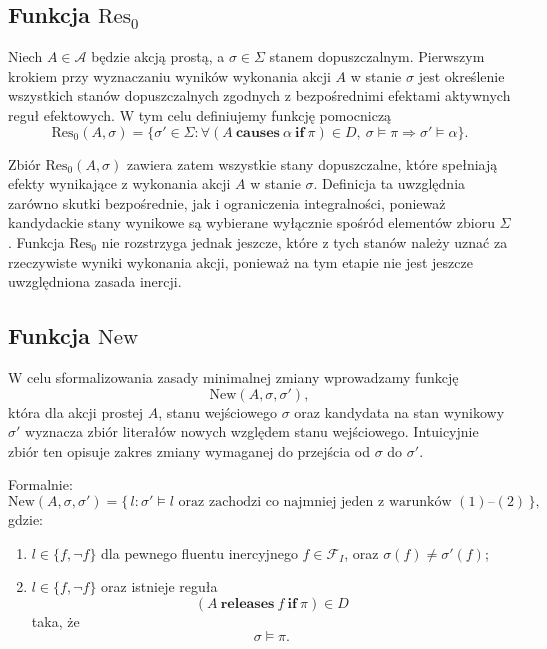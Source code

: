 \documentclass[11pt,a4paper]{article}
\theoremstyle{definition}
\begin{document}
\subsection{Funkcja \texorpdfstring{$\mathrm{Res}_0$}{Res0}}

Niech $A \in \mathcal{A}$ będzie akcją prostą, a $\sigma \in \Sigma$ stanem dopuszczalnym. Pierwszym krokiem przy wyznaczaniu wyników wykonania akcji $A$ w stanie $\sigma$ jest określenie wszystkich stanów dopuszczalnych zgodnych z bezpośrednimi efektami aktywnych reguł efektowych. W tym celu definiujemy funkcję pomocniczą
\[
\mathrm{Res}_0(A,\sigma)=
\{\sigma' \in \Sigma :
\forall (A\ \textbf{causes}\ \alpha\ \textbf{if}\ \pi)\in D,\ 
\sigma \models \pi \Rightarrow \sigma' \models \alpha\}.
\]

Zbiór $\mathrm{Res}_0(A,\sigma)$ zawiera zatem wszystkie stany dopuszczalne, które spełniają efekty wynikające z wykonania akcji $A$ w stanie $\sigma$. Definicja ta uwzględnia zarówno skutki bezpośrednie, jak i ograniczenia integralności, ponieważ kandydackie stany wynikowe są wybierane wyłącznie spośród elementów zbioru $\Sigma$. Funkcja $\mathrm{Res}_0$ nie rozstrzyga jednak jeszcze, które z tych stanów należy uznać za rzeczywiste wyniki wykonania akcji, ponieważ na tym etapie nie jest jeszcze uwzględniona zasada inercji.

\subsection{Funkcja \texorpdfstring{$\mathrm{New}$}{New}}

W celu sformalizowania zasady minimalnej zmiany wprowadzamy funkcję
\[
\mathrm{New}(A,\sigma,\sigma'),
\]
która dla akcji prostej $A$, stanu wejściowego $\sigma$ oraz kandydata na stan wynikowy $\sigma'$ wyznacza zbiór literałów nowych względem stanu wejściowego. Intuicyjnie zbiór ten opisuje zakres zmiany wymaganej do przejścia od $\sigma$ do $\sigma'$.

Formalnie:
\[
\mathrm{New}(A,\sigma,\sigma')=
\{\, l : \sigma' \models l \text{ oraz zachodzi co najmniej jeden z warunków } (1)\text{--}(2)\,\},
\]
gdzie:
\begin{enumerate}
    \item $l \in \{f, \neg f\}$ dla pewnego fluentu inercyjnego $f \in \mathcal{F}_I$, oraz $\sigma(f)\neq \sigma'(f)$;
    \item $l \in \{f, \neg f\}$ oraz istnieje reguła
    \[
    (A\ \textbf{releases}\ f\ \textbf{if}\ \pi)\in D
    \]
    taka, że
    \[
    \sigma \models \pi.
    \]
\end{enumerate}
\end{document}
